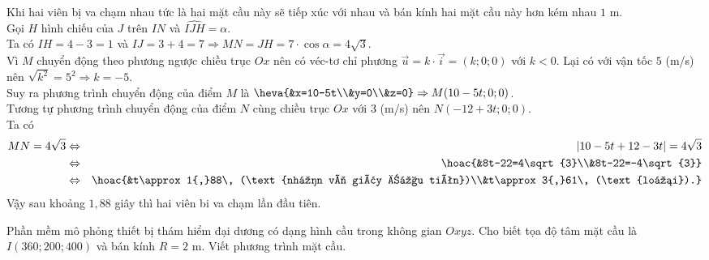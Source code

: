 \begin{bt}
{\begin{center}
		\end{center}
		Khi hai viên bị va chạm nhau tức là hai mặt cầu này sẽ tiếp xúc với nhau và bán kính hai mặt  cầu này hơn kém nhau $1$ m.\\
		Gọi $H$ hình chiếu của $J$ trên $IN$ và $\widehat{IJH}=\alpha$.\\ 
		Ta có $IH=4-3=1$ và $IJ=3+4=7\Rightarrow  MN=JH=7\cdot \cos\alpha=4\sqrt{3}$.\\
		Vì $M$ chuyển  động theo phương ngược chiều trục $Ox$ nên có véc-tơ chỉ phương $\overrightarrow{u}=k\cdot\overrightarrow{i}=(k;0;0)$ với $k<0$. Lại có với vận tốc $5$ (m/s) nên $\sqrt{k^2}=5^2\Rightarrow k=-5$.\\
		 Suy ra phương trình chuyển động của điểm $M$ là $\heva{&x=10-5t\\&y=0\\&z=0}\Rightarrow M(10-5t;0;0)$.\\
		Tương tự phương trình chuyển động của điểm  $N$ cùng chiều trục $Ox$ với $3$ (m/s) nên $N(-12+3t;0;0)$.\\
		Ta  có
		\allowdisplaybreaks 
		\begin{eqnarray*}
			 MN=4\sqrt{3}&\Leftrightarrow&|10-5t+12-3t|=4\sqrt{3}\\
			&\Leftrightarrow&  \hoac{&8t-22=4\sqrt{3}\\&8t-22=-4\sqrt{3}}\\
			&\Leftrightarrow&  \hoac{&t\approx 1{,}88\, (\text{nhận vì giây đầu tiên})\\&t\approx 3{,}61\, (\text{loại}).}
		\end{eqnarray*}
		 Vậy sau khoảng $1{,}88$ giây thì hai viên bi va chạm lần đầu tiên.\\
	 }
\end{bt}



\begin{bt}%
	Phần mềm mô phỏng thiết bị thám hiểm đại dương có dạng hình cầu trong không gian $Oxyz$. Cho biết tọa  độ tâm mặt cầu là $I\left(360;200;400\right)$ và bán kính $R=2$ m. Viết phương trình mặt cầu.
\end{bt}

